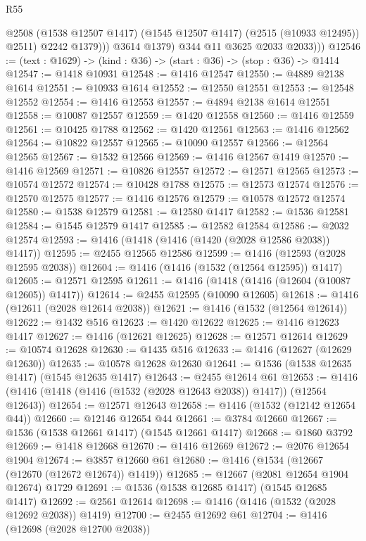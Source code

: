 \begin{lexlean}{R55}
\begin{coremodule}
{{                  @2508 (@1538 @12507 @1417) (@1545 @12507 @1417) (@2515 (@10933 @12495)) @2511)
                  @2242
                  @1379)))
            @3614
            @1379)
          @344
          @11
          @3625
          @2033
          @2033)))
@12546 := (text : @1629) -> (kind : @36) -> (start : @36) -> (stop : @36) -> @1414
@12547 := @1418 @10931
@12548 := @1416 @12547
@12550 := @4889 @2138 @1614
@12551 := @10933 @1614
@12552 := @12550 @12551
@12553 := @12548 @12552
@12554 := @1416 @12553
@12557 := @4894 @2138 @1614 @12551
@12558 := @10087 @12557
@12559 := @1420 @12558
@12560 := @1416 @12559
@12561 := @10425 @1788
@12562 := @1420 @12561
@12563 := @1416 @12562
@12564 := @10822 @12557
@12565 := @10090 @12557
@12566 := @12564 @12565
@12567 := @1532 @12566
@12569 := @1416 @12567 @1419
@12570 := @1416 @12569
@12571 := @10826 @12557
@12572 := @12571 @12565
@12573 := @10574 @12572
@12574 := @10428 @1788
@12575 := @12573 @12574
@12576 := @12570 @12575
@12577 := @1416 @12576
@12579 := @10578 @12572 @12574
@12580 := @1538 @12579
@12581 := @12580 @1417
@12582 := @1536 @12581
@12584 := @1545 @12579 @1417
@12585 := @12582 @12584
@12586 := @2032 @12574
@12593 := @1416 (@1418 (@1416 (@1420 (@2028 @12586 @2038)) @1417))
@12595 := @2455 @12565 @12586
@12599 := @1416 (@12593 (@2028 @12595 @2038))
@12604 := @1416 (@1416 (@1532 (@12564 @12595)) @1417)
@12605 := @12571 @12595
@12611 := @1416 (@1418 (@1416 (@12604 (@10087 @12605)) @1417))
@12614 := @2455 @12595 (@10090 @12605)
@12618 := @1416 (@12611 (@2028 @12614 @2038))
@12621 := @1416 (@1532 (@12564 @12614))
@12622 := @1432 @516
@12623 := @1420 @12622
@12625 := @1416 @12623 @1417
@12627 := @1416 (@12621 @12625)
@12628 := @12571 @12614
@12629 := @10574 @12628
@12630 := @1435 @516
@12633 := @1416 (@12627 (@12629 @12630))
@12635 := @10578 @12628 @12630
@12641 := @1536 (@1538 @12635 @1417) (@1545 @12635 @1417)
@12643 := @2455 @12614 @61
@12653 := @1416 (@1416 (@1418 (@1416 (@1532 (@2028 @12643 @2038)) @1417)) (@12564 @12643))
@12654 := @12571 @12643
@12658 := @1416 (@1532 (@12142 @12654 @44))
@12660 := @12146 @12654 @44
@12661 := @3784 @12660
@12667 := @1536 (@1538 @12661 @1417) (@1545 @12661 @1417)
@12668 := @1860 @3792
@12669 := @1418 @12668
@12670 := @1416 @12669
@12672 := @2076 @12654 @1904
@12674 := @3857 @12660 @61
@12680 := @1416 (@1534 (@12667 (@12670 (@12672 @12674)) @1419))
@12685 := @12667 (@2081 @12654 @1904 @12674) @1729
@12691 := @1536 (@1538 @12685 @1417) (@1545 @12685 @1417)
@12692 := @2561 @12614
@12698 := @1416 (@1416 (@1532 (@2028 @12692 @2038)) @1419)
@12700 := @2455 @12692 @61
@12704 := @1416 (@12698 (@2028 @12700 @2038))
}}
\end{coremodule}
\end{lexlean}

